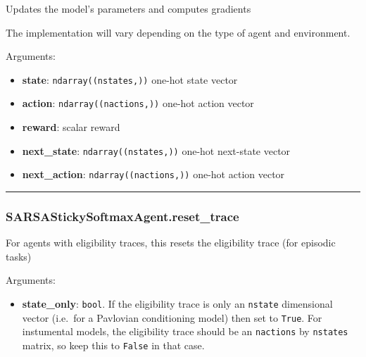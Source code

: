 \begin{Shaded}
\begin{Highlighting}[]
\end{Highlighting}
\end{Shaded}

Updates the model's parameters and computes gradients

The implementation will vary depending on the type of agent and
environment.

Arguments:

\begin{itemize}
\tightlist
\item
  \textbf{state}: \texttt{ndarray((nstates,))} one-hot state vector
\item
  \textbf{action}: \texttt{ndarray((nactions,))} one-hot action vector
\item
  \textbf{reward}: scalar reward
\item
  \textbf{next\_state}: \texttt{ndarray((nstates,))} one-hot next-state
  vector
\item
  \textbf{next\_action}: \texttt{ndarray((nactions,))} one-hot action
  vector
\end{itemize}

\begin{center}\rule{0.5\linewidth}{\linethickness}\end{center}

\subsubsection{SARSAStickySoftmaxAgent.reset\_trace}\label{sarsastickysoftmaxagent.reset_trace}

\begin{Shaded}
\begin{Highlighting}[]
\OperatorTok{=}\NormalTok{)}
\end{Highlighting}
\end{Shaded}

For agents with eligibility traces, this resets the eligibility trace
(for episodic tasks)

Arguments:

\begin{itemize}
\tightlist
\item
  \textbf{state\_only}: \texttt{bool}. If the eligibility trace is only
  an \texttt{nstate} dimensional vector (i.e.~for a Pavlovian
  conditioning model) then set to \texttt{True}. For instumental models,
  the eligibility trace should be an \texttt{nactions} by
  \texttt{nstates} matrix, so keep this to \texttt{False} in that case.
\end{itemize}

